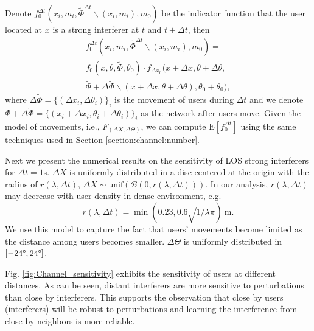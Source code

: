 \documentclass[10pt, conference, letterpaper]{IEEEtran}
\begin{document}
Denote $f_0^{\Delta  t}(x_i, m_i, \tilde{\Phi}^{\Delta t}\backslash (x_i, m_i), m_0)$ be the indicator function that the user located at $x$ is a strong interferer at $t$ and $t + \Delta t$, then 
\begin{multline*}
f_0^{\Delta  t}(x_i, m_i, \tilde{\Phi}^{\Delta t}\backslash (x_i, m_i), m_0) = \\
f_0(x,\theta, \tilde{\Phi}, \theta_0) 
\cdot f_{\Delta x_0}(x+\Delta x,\theta + \Delta \theta, 
\\ \tilde{\Phi} + \Delta \tilde{\Phi}\backslash (x+\Delta x,\theta + \Delta \theta), \theta_0+\theta_0),
\end{multline*}
where $\Delta \tilde{\Phi} = \{(\Delta x_i, \Delta \theta_i)\}_i$ is the movement of users during $\Delta t$ and we denote $\tilde{\Phi} + \Delta \tilde{\Phi} = \{(x_i+\Delta x_i, \theta_i + \Delta \theta_i)\}_i$ as the network after users move.  
Given the model of movements, i.e., $F_{(\Delta X, \Delta \Theta)}$, we can compute $\mathrm{E}[f_0^{\Delta t}]$ using the same techniques used in Section \ref{section:channel:number}. 

Next we present the numerical results on the sensitivity of LOS strong interferers for $\Delta t= 1$s.
$\Delta X$ is uniformly distributed in a disc centered at the origin with the radius of $r(\lambda, \Delta t)$, $\Delta X \sim \mathrm{unif}(\mathcal{B}(0, r(\lambda, \Delta t)))$. 
In our analysis, $r(\lambda, \Delta t)$ may decrease with user density in dense environment, e.g.
\begin{equation*}
r(\lambda,\Delta t) = \min(0.23, 0.6 \sqrt{1/\lambda\pi}) \mathrm{~m}.
\end{equation*}
We use this model to capture the fact that users' movements become limited as the distance among users becomes smaller. $\Delta \Theta$ is uniformly distributed in $[-24\degree, 24 \degree]$.


Fig. \ref{fig:Channel_sensitivity} exhibits the sensitivity of users at different distances. 
As can be seen, distant interferers are more sensitive to perturbations than close by interferers. 
This supports the observation that close by users (interferers) will be robust to perturbations and learning the interference from close by neighbors is more reliable. 
\end{document}

